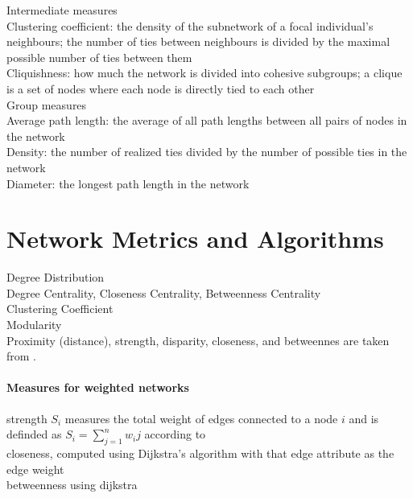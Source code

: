 Intermediate measures\\

Clustering coefficient: the density of the subnetwork of a focal
individual’s neighbours; the number of ties between
neighbours is divided by the maximal possible number of
ties between them\\

Cliquishness: how much the network is divided into cohesive
subgroups; a clique is a set of nodes where each node
is directly tied to each other\\

Group measures\\

Average path length: the average of all path lengths between
all pairs of nodes in the network\\

Density: the number of realized ties divided by the number
of possible ties in the network\\

Diameter: the longest path length in the network\\
\textcite{wey2008social}

\section{Network Metrics and Algorithms}
Degree Distribution\\
Degree Centrality, Closeness Centrality, Betweenness Centrality\\
Clustering Coefficient\\
Modularity\\

Proximity (distance), strength, disparity, closeness, and betweennes are taken from \textcite{jeanson2012long}.\\

\paragraph*{Measures for weighted networks}
strength $S_i$ measures the total weight of edges connected to a node $i$ and is definded as $S_i = \sum_{j=1}^{n}w_ij$ according to~\textcite{barrat2004architecture}\\
closeness, computed using Dijkstra’s algorithm with that edge attribute as the edge weight~\cite{newman2001scientific}\\
betweenness using dijkstra~\cite{brandes2001faster}\\

